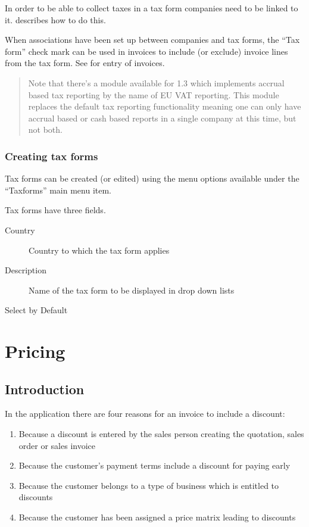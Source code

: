 In order to be able to collect taxes in a tax form companies need to be
linked to it.  describes how to do this.

When associations have been set up between companies and
tax forms, the ``Tax form'' check mark can be used in invoices to include
(or exclude) invoice lines from the tax form. See 
for entry of invoices.

\begin{quotation}
Note that there's a module available for 1.3 which implements accrual based tax reporting by
the name of EU VAT reporting. This module replaces the default tax reporting functionality
meaning one can only have accrual based or cash based reports in a single company at this time,
but not both.
\end{quotation}

\subsection{Creating tax forms}

Tax forms can be created (or edited) using the menu options available under the
``Taxforms'' main menu item.

Tax forms have three fields.

\begin{description}
\item [Country] Country to which the tax form applies
\item [Description] Name of the tax form to be displayed in drop down lists
\item [Select by Default] %
\end{description}



\chapter{Pricing}

\section{Introduction}

In the application there are four reasons for an invoice to include a discount:

\begin{enumerate}
\item Because a discount is entered by the sales person creating the quotation,
  sales order or sales invoice
\item Because the customer's payment terms include a discount for paying early
\item Because the customer belongs to a type of business which is entitled to discounts
\label{item:PricingBusinessType}
\item Because the customer has been assigned a price matrix leading to discounts
\label{item:PricingPriceMatrix}
\end{enumerate}

